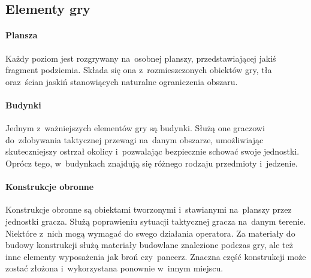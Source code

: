 \documentclass[licencjacka]{pracamgr}
\begin{document}
    \subsection{Elementy gry}
      \paragraph{Plansza}
	Każdy poziom jest rozgrywany na~osobnej planszy, przedstawiającej jakiś fragment podziemia. Składa się ona z~rozmieszczonych
	obiektów gry, tła oraz~ścian jaskiń stanowiących naturalne ograniczenia obszaru.
      \paragraph{Budynki}
	Jednym z~ważniejszych elementów gry są budynki. Służą one graczowi do~zdobywania taktycznej przewagi na~danym
	obszarze, umożliwiając skuteczniejszy ostrzał okolicy i~pozwalając bezpiecznie schować swoje jednostki. Oprócz tego,
	w~budynkach znajdują się różnego rodzaju przedmioty i~jedzenie.
      \paragraph{Konstrukcje obronne}
	Konstrukcje obronne są obiektami tworzonymi i~stawianymi na~planszy przez jednostki gracza. Służą poprawieniu sytuacji
	taktycznej gracza na~danym terenie. Niektóre z~nich mogą wymagać do swego działania operatora. Za materiały do budowy konstrukcji
	służą materiały budowlane znalezione podczas gry, ale też inne elementy wyposażenia jak broń czy~pancerz. Znaczna część konstrukcji może zostać
	złożona i~wykorzystana ponownie w~innym miejscu.
\end{document}
